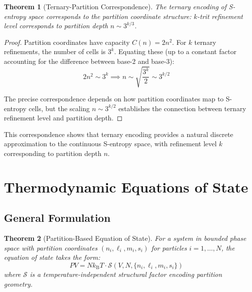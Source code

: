\documentclass[11pt,twocolumn,a4paper]{article}
\newtheorem{theorem}{Theorem}[section]
\theoremstyle{definition}
\theoremstyle{remark}
\newcommand{\kB}{k_{\mathrm{B}}}
\begin{document}
\begin{theorem}[Ternary-Partition Correspondence]
\label{thm:ternary_partition}
The ternary encoding of S-entropy space corresponds to the partition coordinate structure: $k$-trit refinement level corresponds to partition depth $n \sim 3^{k/3}$.
\end{theorem}

\begin{proof}
Partition coordinates have capacity $C(n) = 2n^2$. For $k$ ternary refinements, the number of cells is $3^k$. Equating these (up to a constant factor accounting for the difference between base-2 and base-3):
\begin{equation}
2n^2 \sim 3^k \implies n \sim \sqrt{\frac{3^k}{2}} \sim 3^{k/2}
\end{equation}

The precise correspondence depends on how partition coordinates map to S-entropy cells, but the scaling $n \sim 3^{k/2}$ establishes the connection between ternary refinement level and partition depth.
\end{proof}

This correspondence shows that ternary encoding provides a natural discrete approximation to the continuous S-entropy space, with refinement level $k$ corresponding to partition depth $n$.

\section{Thermodynamic Equations of State}
\label{sec:equations_of_state}

\subsection{General Formulation}

\begin{theorem}[Partition-Based Equation of State]
\label{thm:partition_eos}
For a system in bounded phase space with partition coordinates $(n_i,\ell_i,m_i,s_i)$ for particles $i = 1,\ldots,N$, the equation of state takes the form:
\begin{equation}
PV = N\kB T \cdot \mathcal{S}(V,N,\{n_i,\ell_i,m_i,s_i\})
\label{eq:general_eos}
\end{equation}
where $\mathcal{S}$ is a temperature-independent structural factor encoding partition geometry.
\end{theorem}
\end{document}
